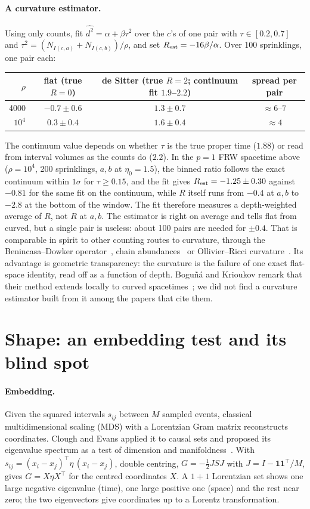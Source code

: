 \documentclass[11pt,a4paper]{article}
\begin{document}
\paragraph{A curvature estimator.} Using only counts, fit $\widehat{d^2}=\alpha+\beta\tau^2$ over the $c$'s of one pair with $\tau\in[0.2,0.7]$ and $\tau^2=(N_{I(c,a)}+N_{I(c,b)})/\rho$, and set $R_{\rm est}=-16\beta/\alpha$. Over 100 sprinklings, one pair each:
\begin{center}\small
\begin{tabular}{@{}rccc@{}}
\toprule
$\rho$ & flat (true $R=0$) & de Sitter (true $R=2$; continuum fit $1.9$--$2.2$) & spread per pair\\
\midrule
4000 & $-0.7\pm0.6$ & $1.3\pm0.7$ & $\approx6$--$7$\\
$10^4$ & $0.3\pm0.4$ & $1.6\pm0.4$ & $\approx4$\\
\bottomrule
\end{tabular}
\end{center}
The continuum value depends on whether $\tau$ is the true proper time ($1.88$) or read from interval volumes as the counts do ($2.2$). In the $p=1$ FRW spacetime above ($\rho=10^4$, 200 sprinklings, $a,b$ at $\eta_0=1.5$), the binned ratio follows the exact continuum within $1\sigma$ for $\tau\ge0.15$, and the fit gives $R_{\rm est}=-1.25\pm0.30$ against $-0.81$ for the same fit on the continuum, while $R$ itself runs from $-0.4$ at $a,b$ to $-2.8$ at the bottom of the window. The fit therefore measures a depth-weighted average of $R$, not $R$ at $a,b$. The estimator is right on average and tells flat from curved, but a single pair is useless: about 100 pairs are needed for $\pm0.4$. That is comparable in spirit to other counting routes to curvature, through the Benincasa--Dowker operator~\cite{BD10}, chain abundances~\cite{RSS13} or Ollivier--Ricci curvature~\cite{BBR26}. Its advantage is geometric transparency: the curvature is the failure of one exact flat-space identity, read off as a function of depth. Bogu\~n\'a and Krioukov remark that their method extends locally to curved spacetimes~\cite{BK24}; we did not find a curvature estimator built from it among the papers that cite them.

\section{Shape: an embedding test and its blind spot}\label{sec:embed}
\paragraph{Embedding.} Given the squared intervals $s_{ij}$ between $M$ sampled events, classical multidimensional scaling (MDS) with a Lorentzian Gram matrix reconstructs coordinates. Clough and Evans applied it to causal sets and proposed its eigenvalue spectrum as a test of dimension and manifoldness~\cite{CloughEvans16}. With $s_{ij}=(x_i-x_j)^{\!\top}\eta\,(x_i-x_j)$, double centring, $G=-\tfrac12JSJ$ with $J=I-\mathbf1\mathbf1^{\!\top}/M$, gives $G=X\eta X^{\!\top}$ for the centred coordinates $X$. A $1+1$ Lorentzian set shows one large negative eigenvalue (time), one large positive one (space) and the rest near zero; the two eigenvectors give coordinates up to a Lorentz transformation.
\end{document}

